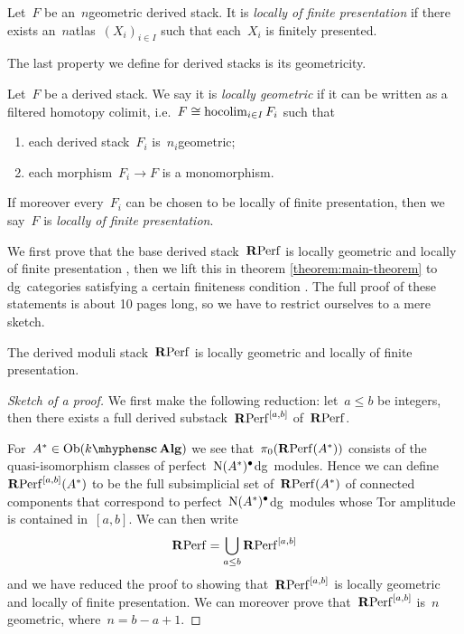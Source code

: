 \begin{refsection}
\begin{definition}
  Let~$F$ be an~$n$\dash geometric derived stack. It is \emph{locally of finite presentation} if there exists an~$n$\dash atlas~$(X_i)_{i\in I}$ such that each~$X_i$ is finitely presented.
\end{definition}
The last property we define for derived stacks is its geometricity.
\begin{definition}
  Let~$F$ be a derived stack. We say it is \emph{locally geometric} if it can be written as a filtered homotopy colimit, i.e.\ $F\cong\operatorname*{hocolim}_{i\in I}F_i$
  such that
  \begin{enumerate}
    \item each derived stack~$F_i$ is~$n_i$\dash geometric;
    \item each morphism~$F_i\to F$ is a monomorphism.
  \end{enumerate}
  If moreover every~$F_i$ can be chosen to be locally of finite presentation, then we say~$F$ is \emph{locally of finite presentation}.
\end{definition}

We first prove that the base derived stack~$\mathbf{R}\mathrm{Perf}$ is locally geometric and locally of finite presentation \cite[proposition 3.7]{toen-vaquie}, then we lift this in theorem \ref{theorem:main-theorem} to dg~categories satisfying a certain finiteness condition \cite[theorem 3.6]{toen-vaquie}. The full proof of these statements is about 10 pages long, so we have to restrict ourselves to a mere sketch.
\begin{theorem}
  \label{theorem:main-theorem-RPerf}
  The derived moduli stack~$\mathbf{R}\mathrm{Perf}$ is locally geometric and locally of finite presentation.

  \begin{proof}[Sketch of a proof]
    We first make the following reduction: let~$a\leq b$ be integers, then there exists a full derived substack~$\mathbf{R}\mathrm{Perf}^{[a,b]}$ of~$\mathbf{R}\mathrm{Perf}$.
    
    For~$A^*\in\Ob(\scAlg{k})$ we see that~$\pi_0(\mathbf{R}\mathrm{Perf}(A^*))$ consists of the quasi-isomorphism classes of perfect~$\operatorname{N}(A^*)^\bullet$\dash dg~modules. Hence we can define~$\mathbf{R}\mathrm{Perf}^{[a,b]}(A^*)$ to be the full subsimplicial set of~$\mathbf{R}\mathrm{Perf}(A^*)$ of connected components that correspond to perfect~$\operatorname{N}(A^*)^\bullet$\dash dg~modules whose Tor amplitude is contained in~$[a,b]$. We can then write
    \begin{equation}
      \mathbf{R}\mathrm{Perf}=\bigcup_{a\leq b}\mathbf{R}\mathrm{Perf}^{[a,b]}
    \end{equation}
    and we have reduced the proof to showing that~$\mathbf{R}\mathrm{Perf}^{[a,b]}$ is locally geometric and locally of finite presentation. We can moreover prove that~$\mathbf{R}\mathrm{Perf}^{[a,b]}$ is~$n$\dash geometric, where~$n=b-a+1$.


\end{proof}
\end{theorem}
\end{refsection}
